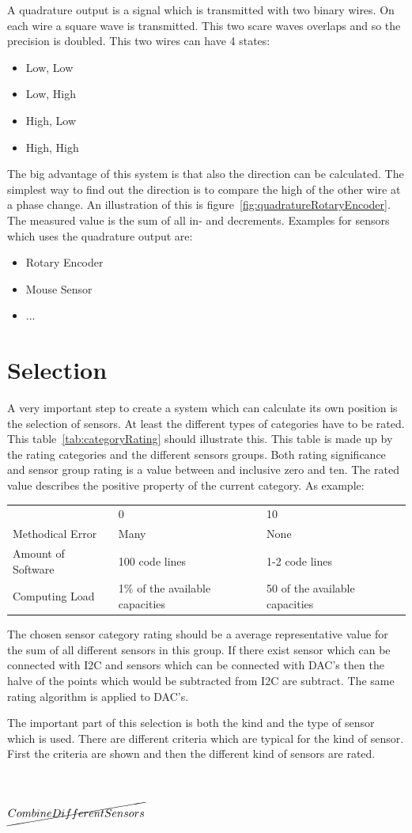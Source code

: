 A quadrature output is a signal which is transmitted with two binary wires.
On each wire a square wave is transmitted.
This two scare waves overlaps and so the precision is doubled.
This two wires can have 4 states:
\begin{itemize}
\item Low, Low
\item Low, High
\item High, Low
\item High, High
\end{itemize}
The big advantage of this system is that also the direction can be calculated.
The simplest way to find out the direction is to compare the high of the other wire at a phase change.
An illustration of this is figure~\ref{fig:quadratureRotaryEncoder}.
The measured value is the sum of all in- and decrements.
Examples for sensors which uses the quadrature output are:
\begin{itemize}
\item Rotary Encoder
\item Mouse Sensor
\item ...
\end{itemize}


\section{Selection}
A very important step to create a system which can calculate its own position is the selection of sensors.
At least the different types of categories have to be rated.
This table~\ref{tab:categoryRating} should illustrate this.
This table is made up by the rating categories and the different sensors groups.
Both rating significance and sensor group rating is a value between and inclusive zero and ten.
The rated value describes the positive property of the current category.
As example:\\
\begin{tabular}{l|l|l}
& 0 & 10 \\
Methodical Error & Many & None\\
Amount of Software & 100 code lines & 1-2 code lines\\
Computing Load & 1\% of the available capacities & 50 of the available capacities\\
\end{tabular}
The chosen sensor category rating should be a average representative value for the sum of all different sensors in this group.
If there exist sensor which can be connected with I2C and sensors which can be connected with DAC's then the halve of the points which would be subtracted from I2C are subtract. The same rating algorithm is applied to DAC's.

The important part of this selection is both the kind and the type of sensor which
is used. There are different criteria which are typical for the kind of sensor. First the
criteria are shown and then the different kind of sensors are rated.

%


\section{$\cancel{Combine Different Sensors}$}